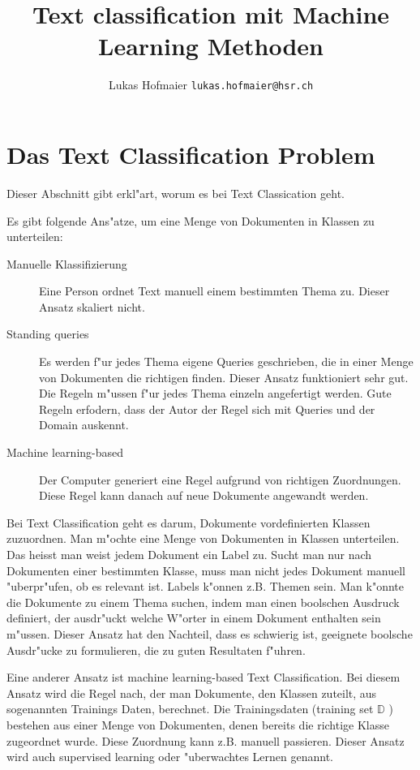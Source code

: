 \documentclass[12pt,a4paper,twoside]{article}
\begin{document}
\lstset{
basicstyle=\small\ttfamily,
xleftmargin=3.5em,
language=Promela,
captionpos=b
}

\title{Text classification mit Machine Learning Methoden}
\author{Lukas Hofmaier \texttt{lukas.hofmaier@hsr.ch}}
\maketitle

\section{Das Text Classification Problem}
\label{sec:problem}

Dieser Abschnitt gibt erkl"art, worum es bei Text Classication geht.

Es gibt folgende Ans"atze, um eine Menge von Dokumenten in Klassen zu unterteilen:
\begin{description}
\item[Manuelle Klassifizierung] Eine Person ordnet Text manuell einem bestimmten Thema zu. Dieser Ansatz skaliert nicht.
\item[Standing queries] Es werden f"ur jedes Thema eigene Queries geschrieben, die in einer Menge von Dokumenten die richtigen finden. Dieser Ansatz funktioniert sehr gut. Die Regeln m"ussen f"ur jedes Thema einzeln angefertigt werden. Gute Regeln erfodern, dass der Autor der Regel sich mit Queries und der Domain auskennt.
\item[Machine learning-based] Der Computer generiert eine Regel aufgrund von richtigen Zuordnungen. Diese Regel kann danach auf neue Dokumente angewandt werden.
\end{description}


Bei Text Classification geht es darum, Dokumente vordefinierten Klassen zuzuordnen. Man m"ochte eine Menge von Dokumenten in Klassen unterteilen. Das heisst man weist jedem Dokument ein Label zu. Sucht man nur nach Dokumenten einer bestimmten Klasse, muss man nicht jedes Dokument manuell "uberpr"ufen, ob es relevant ist. Labels k"onnen z.B. Themen sein. Man k"onnte die Dokumente zu einem Thema suchen, indem man einen boolschen Ausdruck definiert, der ausdr"uckt welche W"orter in einem Dokument enthalten sein m"ussen. Dieser Ansatz hat den Nachteil, dass es schwierig ist, geeignete boolsche Ausdr"ucke zu formulieren, die zu guten Resultaten f"uhren.

Eine anderer Ansatz ist machine learning-based Text Classification. Bei diesem Ansatz wird die Regel nach, der man Dokumente, den Klassen zuteilt, aus sogenannten Trainings Daten, berechnet. Die Trainingsdaten (training set $\mathbb{D}$ ) bestehen aus einer Menge von Dokumenten, denen bereits die richtige Klasse zugeordnet wurde. Diese Zuordnung kann z.B. manuell passieren. Dieser Ansatz wird auch supervised learning oder "uberwachtes Lernen genannt. 
\end{document}
